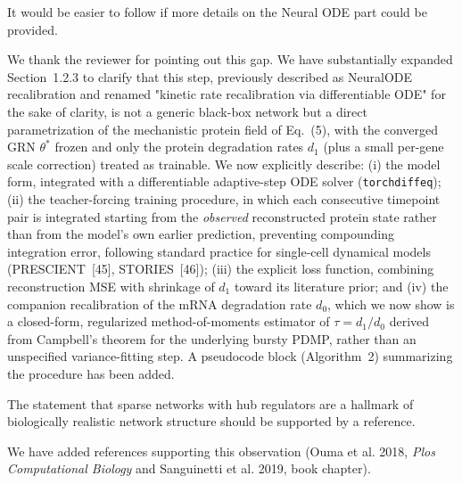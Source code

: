 \documentclass[11pt,a4paper]{article}
\newcounter{revtotal}   %
\newcounter{revlocal}   %
\newcommand{\currentreviewer}{}  %
\newcommand{\revcomment}[2]{%
  \stepcounter{revtotal}%
  \stepcounter{revlocal}%
  \edef\commentlabel{\currentreviewer.\arabic{revlocal}}%
  \begin{tcolorbox}[revstyle,
      title={\commentlabel\ $|$\ #1}]
    #2
  \end{tcolorbox}%
  \edef\lastcommentlabel{\commentlabel}%
}
\newcommand{\response}[1]{%
  \begin{tcolorbox}[respstyle,
      title={Response to \lastcommentlabel}]
    #1
  \end{tcolorbox}%
}
\begin{document}
\revcomment{NeuralODE recalibration step (line~302) is difficult to follow}{%
It would be easier to follow if more details on the Neural ODE part could be provided.}
\response{%
We thank the reviewer for pointing out this gap. We have substantially expanded
Section~1.2.3 to clarify that this step, previously described as NeuralODE recalibration and renamed "kinetic rate recalibration via differentiable ODE" for the sake of clarity, is not a generic black-box network but a
direct parametrization of the mechanistic protein field of Eq.~(5), with the converged
GRN $\theta^*$ frozen and only the protein degradation rates $d_1$ (plus a small per-gene
scale correction) treated as trainable. We now explicitly describe: (i) the model form,
integrated with a differentiable adaptive-step ODE solver (\texttt{torchdiffeq}); (ii) the
teacher-forcing training procedure, in which each consecutive timepoint pair is integrated
starting from the \emph{observed} reconstructed protein state rather than from the model's
own earlier prediction, preventing compounding integration error, following standard
practice for single-cell dynamical models (PRESCIENT~[45], STORIES~[46]); (iii) the explicit
loss function, combining reconstruction MSE with shrinkage of $d_1$ toward its literature
prior; and (iv) the companion recalibration of the mRNA degradation rate $d_0$, which we now
show is a closed-form, regularized method-of-moments estimator of $\tau = d_1/d_0$
derived from Campbell's theorem for the underlying bursty PDMP, rather than an unspecified
variance-fitting step. A pseudocode block (Algorithm~2) summarizing the procedure
has been added.
}


\revcomment{Reference needed for hub-regulator claim (line~460)}{%
The statement that sparse networks with hub regulators are a hallmark of biologically
realistic network structure should be supported by a reference.}
\response{%
We have added references supporting this observation (Ouma et al. 2018, \textit{Plos Computational Biology} and Sanguinetti et al. 2019, book chapter).}
\end{document}
